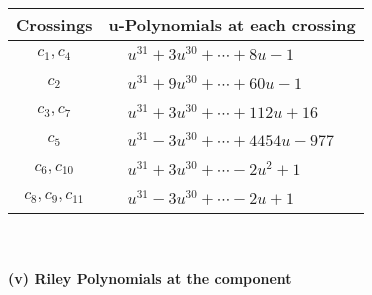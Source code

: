 \documentclass[1p]{elsarticle_modified}
\theoremstyle{definition}
\begin{document}
\begin{tabular}{m{50pt}|m{274pt}}
Crossings & \hspace{64pt}u-Polynomials at each crossing \\
\hline $$\begin{aligned}c_{1},c_{4}\end{aligned}$$&$\begin{aligned}
&u^{31}+3 u^{30}+\cdots+8 u-1
\end{aligned}$\\
\hline $$\begin{aligned}c_{2}\end{aligned}$$&$\begin{aligned}
&u^{31}+9 u^{30}+\cdots+60 u-1
\end{aligned}$\\
\hline $$\begin{aligned}c_{3},c_{7}\end{aligned}$$&$\begin{aligned}
&u^{31}+3 u^{30}+\cdots+112 u+16
\end{aligned}$\\
\hline $$\begin{aligned}c_{5}\end{aligned}$$&$\begin{aligned}
&u^{31}-3 u^{30}+\cdots+4454 u-977
\end{aligned}$\\
\hline $$\begin{aligned}c_{6},c_{10}\end{aligned}$$&$\begin{aligned}
&u^{31}+3 u^{30}+\cdots-2 u^2+1
\end{aligned}$\\
\hline $$\begin{aligned}c_{8},c_{9},c_{11}\end{aligned}$$&$\begin{aligned}
&u^{31}-3 u^{30}+\cdots-2 u+1
\end{aligned}$\\
\hline
\end{tabular}\\~\\
\newpage\renewcommand{\arraystretch}{1}
\flushleft \textbf{(v) Riley Polynomials at the component}\newline \\
\end{document}
